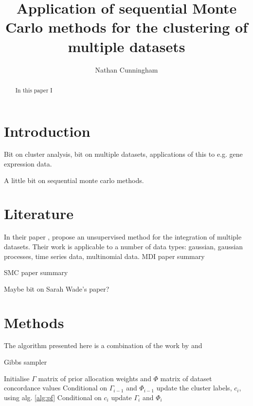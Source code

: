 \documentclass[10pt,a4paper]{report}
\author{Nathan Cunningham}
\title{Application of sequential Monte Carlo methods for the clustering of multiple datasets}
\begin{document}
\maketitle

\begin{abstract}
In this paper I 
\end{abstract}
\section{Introduction}

Bit on cluster analysis, bit on multiple datasets, applications of this to e.g. gene expression data.

A little bit on sequential monte carlo methods.






\section{Literature}
In their paper \cite{kirk2012bayesian}, \citeauthor{kirk2012bayesian} propose an unsupervised method for the integration of multiple datasets. Their work is applicable to a number of data types: gaussian, gaussian processes, time series data, multinomial data.
MDI paper summary \cite{kirk2012bayesian}

SMC paper summary \cite{griffin2014sequential}

Maybe bit on Sarah Wade's paper?
\cite{wade2015bayesian}
\section{Methods}
The algorithm presented here is a combination of the work by \citeauthor{griffin2014sequential} and \citeauthor{kirk2012bayesian}
\begin{algorithm}
\caption{Gibbs sampler}
 \begin{algorithmic}[1]
  \State Initialise $\Gamma$ matrix of prior allocation weights and $\Phi$ matrix of dataset concordance values
  \State Conditional on $\Gamma_{i-1}$ and $\Phi_{i-1}$ update the cluster labels, $c_{i}$, using alg. \ref{alg:pf}
  \State Conditional on $c_{i}$ update $\Gamma_i$ and $\Phi_i$
  \EndFor
\end{algorithmic}
\end{algorithm}
\end{document}
